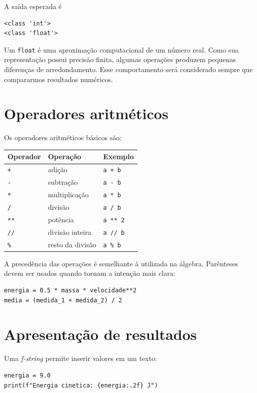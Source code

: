 A saída esperada é

\begin{lstlisting}[style=saidaesperada]
<class 'int'>
<class 'float'>
\end{lstlisting}

Um \texttt{float} é uma aproximação computacional de um número real. Como sua representação possui precisão finita, algumas operações produzem pequenas diferenças de arredondamento. Esse comportamento será considerado sempre que compararmos resultados numéricos.

\section{Operadores aritméticos}

Os operadores aritméticos básicos são:

\begin{center}
\begin{tabular}{lll}
\toprule
Operador & Operação & Exemplo\\
\midrule
\texttt{+} & adição & \texttt{a + b}\\
\texttt{-} & subtração & \texttt{a - b}\\
\texttt{*} & multiplicação & \texttt{a * b}\\
\texttt{/} & divisão & \texttt{a / b}\\
\texttt{**} & potência & \texttt{a ** 2}\\
\texttt{//} & divisão inteira & \texttt{a // b}\\
\texttt{\%} & resto da divisão & \texttt{a \% b}\\
\bottomrule
\end{tabular}
\end{center}

A precedência das operações é semelhante à utilizada na álgebra. Parênteses devem ser usados quando tornam a intenção mais clara:

\begin{lstlisting}
energia = 0.5 * massa * velocidade**2
media = (medida_1 + medida_2) / 2
\end{lstlisting}

\section{Apresentação de resultados}

Uma \emph{f-string} permite inserir valores em um texto:

\begin{lstlisting}
energia = 9.0
print(f"Energia cinetica: {energia:.2f} J")
\end{lstlisting}

